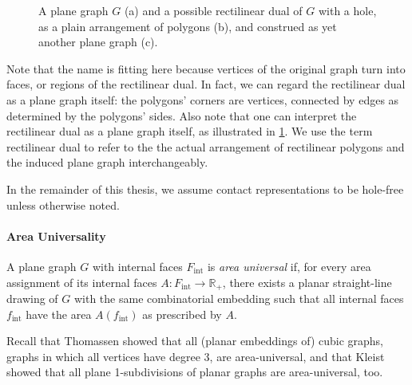 \begin{figure}[H]
	\centering
	\quad
	\quad
	\caption{A plane graph $G$ (a) and a possible rectilinear dual of $G$ with a hole, as a plain arrangement of polygons (b), and construed as yet another plane graph (c).}
	\label{fig:preliminaries-rectilinear-dual}
\end{figure}

Note that the name  is fitting here because vertices of the original graph turn into faces, or regions of the rectilinear dual. In fact, we can regard the rectilinear dual as a plane graph itself: the polygons' corners are vertices, connected by edges as determined by the polygons' sides. Also note that one can interpret the rectilinear dual as a plane graph itself, as illustrated in \cref{fig:preliminaries-rectilinear-dual}. We use the term rectilinear dual to refer to the the actual arrangement of rectilinear polygons and the induced plane graph interchangeably.

In the remainder of this thesis, we assume contact representations to be hole-free unless otherwise noted.



\paragraph{Area Universality}

\begin{definition}
	A plane graph $G$ with internal faces $F_\text{int}$ is \emph{area universal} if, for every area assignment of its internal faces $A \colon F_\text{int} \to \mathbb{R}_+$, there exists a planar straight-line drawing of $G$ with the same combinatorial embedding such that all internal faces $f_\text{int}$ have the area $A(f_\text{int})$ as prescribed by $A$.
\end{definition}

Recall that Thomassen \cite{thomassen1992plane} showed that all (planar embeddings of) cubic graphs, \ie{} graphs in which all vertices have degree 3, are area-universal, and that Kleist \cite{kleist2019planar} showed that all plane 1-subdivisions of planar graphs are area-universal, too.
